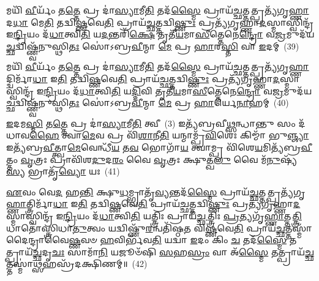 𑌮𑌯𑌿᳴ \ul{𑌵𑍀}\-𑌰𑍍𑌯𑌂᳴ 𑌤\-\ul{𑌤𑍍𑌤𑍇} 𑌪𑍍𑌰 𑌦𑌾॑\-\ul{𑌸𑍍𑌯𑌾}\-𑌮𑍀\-\ul{𑌤𑌿} 𑌤𑌦᳴\-\ul{𑌸𑍍𑌮𑍈} 𑌪𑍍𑌰𑌾𑌯᳴\-\ul{𑌚𑍍𑌛}\-𑌤𑍍𑌤𑌤𑍍𑌪𑍍𑌰𑌤𑍍𑌯᳴𑌗𑍃\-\ul{𑌹𑍍𑌣𑌾}\-𑌦\-\ul{𑌧𑌾} 𑌮𑍇\-\ul{𑌤𑌿} 𑌤𑌦𑍍𑌵𑌿\-\ul{𑌷𑍍𑌣}\-𑌵𑍇\-\ul{𑌤𑌿} 𑌪𑍍𑌰𑌾𑌯᳴\-\ul{𑌚𑍍𑌛}\-𑌤𑍍𑌤𑌦𑍍𑌵𑌿\-\ul{𑌷𑍍𑌣𑍁𑌃} 𑌪𑍍𑌰𑌤𑍍𑌯᳴𑌗𑍃𑌹𑍍𑌣𑌾\-\ul{𑌦}\-𑌸𑍍𑌮𑌾𑌸𑍍𑌵𑌿𑌨𑍍𑌦𑍍𑌰᳴ 𑌇\-\ul{𑌨𑍍𑌦𑍍𑌰𑌿}\-𑌯𑌂 𑌦᳴\-\ul{𑌧𑌾}\-𑌤𑍍𑌵𑌿\-\ul{𑌤𑌿} 𑌯\-\ul{𑌦}\-𑌨𑍍𑌤𑌰𑌿᳴\-\ul{𑌕𑍍𑌷𑍇} 𑌤𑍃𑌤𑍀᳴\-\ul{𑌯}\-𑌮𑌾\-\ul{𑌸𑍀}\-𑌤𑍍𑌤𑍇𑌨𑍇\-\ul{𑌨𑍍𑌦𑍍𑌰𑍋} 𑌵\-\ul{𑌜𑍍𑌰}\-𑌮𑍁𑌦᳴𑌯\-\ul{𑌚𑍍𑌛}\-𑌦𑍍𑌵𑌿𑌷𑍍𑌣𑍍𑌵᳴𑌨𑍁𑌸𑍍𑌥𑌿\-\ul{𑌤𑌃} 𑌸𑍋॑\-𑌽𑌬𑍍𑌰\-\ul{𑌵𑍀}\-𑌨𑍍𑌮𑌾 \ul{𑌮𑍇} 𑌪𑍍𑌰 \ul{𑌹𑌾}\-𑌰\-\ul{𑌸𑍍𑌤𑌿} 𑌵𑌾 \ul{𑌇}\-𑌦𑌮𑍍~(39)

𑌮𑌯𑌿᳴ \ul{𑌵𑍀}\-𑌰𑍍𑌯𑌂᳴ 𑌤\-\ul{𑌤𑍍𑌤𑍇} 𑌪𑍍𑌰 𑌦𑌾॑\-\ul{𑌸𑍍𑌯𑌾}\-𑌮𑍀\-\ul{𑌤𑌿} 𑌤𑌦᳴\-\ul{𑌸𑍍𑌮𑍈} 𑌪𑍍𑌰𑌾𑌯᳴\-\ul{𑌚𑍍𑌛}\-𑌤𑍍𑌤𑌤𑍍𑌪𑍍𑌰𑌤𑍍𑌯᳴𑌗𑍃\-\ul{𑌹𑍍𑌣𑌾}\-𑌦𑍍𑌦𑍍𑌵𑌿𑌰𑍍𑌮𑌾᳴\-\ul{𑌧𑌾} 𑌇\-\ul{𑌤𑌿} 𑌤𑌦𑍍𑌵𑌿\-\ul{𑌷𑍍𑌣}\-𑌵𑍇\-\ul{𑌤𑌿} 𑌪𑍍𑌰𑌾𑌯᳴\-\ul{𑌚𑍍𑌛}\-𑌤𑍍𑌤𑌦𑍍𑌵𑌿\-\ul{𑌷𑍍𑌣𑍁𑌃} 𑌪𑍍𑌰𑌤𑍍𑌯᳴𑌗𑍃𑌹𑍍𑌣𑌾\-\ul{𑌦}\-𑌸𑍍𑌮𑌾𑌸𑍍𑌵𑌿𑌨𑍍𑌦𑍍𑌰᳴ 𑌇\-\ul{𑌨𑍍𑌦𑍍𑌰𑌿}\-𑌯𑌂 𑌦᳴\-\ul{𑌧𑌾}\-𑌤𑍍𑌵𑌿\-\ul{𑌤𑌿} 𑌯\-\ul{𑌦𑍍𑌦𑌿}\-𑌵𑌿 𑌤𑍃𑌤𑍀᳴\-\ul{𑌯}\-𑌮𑌾\-\ul{𑌸𑍀}\-𑌤𑍍𑌤𑍇𑌨𑍇\-\ul{𑌨𑍍𑌦𑍍𑌰𑍋} 𑌵\-\ul{𑌜𑍍𑌰}\-𑌮𑍁𑌦᳴𑌯\-\ul{𑌚𑍍𑌛}\-𑌦𑍍𑌵𑌿𑌷𑍍𑌣𑍍𑌵᳴𑌨𑍁𑌸𑍍𑌥𑌿\-\ul{𑌤𑌃} 𑌸𑍋॑\-𑌽𑌬𑍍𑌰\-\ul{𑌵𑍀}\-𑌨𑍍𑌮𑌾 \ul{𑌮𑍇} 𑌪𑍍𑌰 \ul{𑌹𑌾}\-𑌰𑍍𑌯𑍇\-\ul{𑌨𑌾}\-𑌹𑌮𑍍~(40)

\-\ul{𑌇}\-𑌦𑌮\-\ul{𑌸𑍍𑌮𑌿} 𑌤\-\ul{𑌤𑍍𑌤𑍇} 𑌪𑍍𑌰 𑌦𑌾॑\-\ul{𑌸𑍍𑌯𑌾}\-𑌮𑍀\-\ul{𑌤𑌿} 𑌤𑍍𑌵𑍀~(3) 𑌇𑌤𑍍𑌯᳴𑌬𑍍𑌰𑌵𑍀\-\ul{𑌥𑍍𑌸}\-𑌨𑍍𑌧𑌾𑌨𑍍𑌤𑍁 𑌸𑌂 𑌦᳴𑌧𑌾𑌵\-\ul{𑌹𑍈} 𑌤𑍍𑌵𑌾\-\ul{𑌮𑍇}\-𑌵 𑌪𑍍𑌰 𑌵𑌿᳴\-\ul{𑌶𑌾}\-𑌨𑍀\-\ul{𑌤𑌿} 𑌯𑌨𑍍𑌮𑌾𑌮𑍍𑌪𑍍𑌰᳴\-\ul{𑌵𑌿}\-𑌶𑍇𑌃 𑌕𑌿𑌮𑍍𑌮𑌾᳴ 𑌭𑍁\-\ul{𑌞𑍍𑌜𑍍𑌯𑌾} 𑌇𑌤𑍍𑌯᳴𑌬𑍍𑌰\-\ul{𑌵𑍀}\-𑌤𑍍𑌤𑍍𑌵𑌾\-\ul{𑌮𑍇}\-𑌵𑍇𑌨𑍍𑌧𑍀᳴\-\ul{𑌯} 𑌤\-\ul{𑌵} 𑌭𑍋𑌗𑌾᳴\-\ul{𑌯} 𑌤𑍍𑌵𑌾𑌮𑍍𑌪𑍍𑌰 𑌵𑌿᳴𑌶𑍇\-\ul{𑌯}\-𑌮𑌿𑌤𑍍𑌯᳴𑌬𑍍𑌰\-\ul{𑌵𑍀}\-𑌤𑍍𑌤𑌂 \ul{𑌵𑍃}\-𑌤𑍍𑌰𑌃 𑌪𑍍𑌰𑌾𑌵𑌿᳴𑌶\-\ul{𑌦𑍁}\-𑌦\-\ul{𑌰𑌂} 𑌵𑍈 \ul{𑌵𑍃}\-𑌤𑍍𑌰𑌃 𑌕𑍍𑌷𑍁𑌤𑍍𑌖\-\ul{𑌲𑍁} 𑌵𑍈 𑌮᳴\-\ul{𑌨𑍁}\-𑌷𑍍𑌯᳴\-\ul{𑌸𑍍𑌯} 𑌭𑍍𑌰𑌾𑌤𑍃᳴\-\ul{𑌵𑍍𑌯𑍋} 𑌯𑌃~(41)

\-\ul{𑌏}\-𑌵𑌂 𑌵𑍇\-\ul{𑌦} 𑌹\-\ul{𑌨𑍍𑌤𑌿} 𑌕𑍍𑌷𑍁\-\ul{𑌧}\-𑌮𑍍𑌭𑍍𑌰𑌾𑌤𑍃᳴\-\ul{𑌵𑍍𑌯}\-𑌨𑍍𑌤𑌦᳴\-\ul{𑌸𑍍𑌮𑍈} 𑌪𑍍𑌰𑌾𑌯᳴\-\ul{𑌚𑍍𑌛}\-𑌤𑍍𑌤𑌤𑍍𑌪𑍍𑌰𑌤𑍍𑌯᳴𑌗𑍃\-\ul{𑌹𑍍𑌣𑌾}\-𑌤𑍍𑌤𑍍𑌰𑌿𑌰𑍍𑌮𑌾᳴\-\ul{𑌧𑌾} 𑌇\-\ul{𑌤𑌿} 𑌤𑌦𑍍𑌵𑌿\-\ul{𑌷𑍍𑌣}\-𑌵𑍇\-\ul{𑌤𑌿} 𑌪𑍍𑌰𑌾𑌯᳴\-\ul{𑌚𑍍𑌛}\-𑌤𑍍𑌤𑌦𑍍𑌵𑌿\-\ul{𑌷𑍍𑌣𑍁𑌃} 𑌪𑍍𑌰𑌤𑍍𑌯᳴𑌗𑍃𑌹𑍍𑌣𑌾\-\ul{𑌦}\-𑌸𑍍𑌮𑌾𑌸𑍍𑌵𑌿𑌨𑍍𑌦𑍍𑌰᳴ 𑌇\-\ul{𑌨𑍍𑌦𑍍𑌰𑌿}\-𑌯𑌂 𑌦᳴\-\ul{𑌧𑌾}\-𑌤𑍍𑌵𑌿\-\ul{𑌤𑌿} 𑌯𑌤𑍍𑌤𑍍𑌰𑌿𑌃 𑌪𑍍𑌰𑌾𑌯᳴\-\ul{𑌚𑍍𑌛}\-𑌤𑍍𑌤𑍍𑌰𑌿𑌃 \ul{𑌪𑍍𑌰}\-𑌤𑍍𑌯𑌗𑍃᳴\-\ul{𑌹𑍍𑌣𑌾}\-𑌤𑍍𑌤\-\ul{𑌤𑍍𑌤𑍍𑌰𑌿}\-𑌧𑌾𑌤𑍋॑𑌸𑍍𑌤𑍍𑌰𑌿𑌧𑌾\-\ul{𑌤𑍁}\-𑌤𑍍𑌵𑌂 𑌯𑌦𑍍𑌵𑌿𑌷𑍍𑌣𑍁᳴\-\ul{𑌰}\-𑌨𑍍𑌵𑌤𑌿᳴𑌷𑍍𑌠\-\ul{𑌤} 𑌵𑌿\-\ul{𑌷𑍍𑌣}\-𑌵𑍇\-\ul{𑌤𑌿} 𑌪𑍍𑌰𑌾𑌯᳴\-\ul{𑌚𑍍𑌛}\-𑌤𑍍𑌤𑌸𑍍𑌮𑌾᳴𑌦𑍈𑌨𑍍𑌦𑍍𑌰𑌾𑌵𑍈\-\ul{𑌷𑍍𑌣}\-𑌵𑍞 \ul{𑌹}\-𑌵𑌿𑌰𑍍𑌭᳴𑌵\-\ul{𑌤𑌿} 𑌯𑌦𑍍𑌵𑌾 \ul{𑌇}\-𑌦𑌂 𑌕𑌿𑌂 \ul{𑌚} 𑌤𑌦᳴\-\ul{𑌸𑍍𑌮𑍈} 𑌤𑌤𑍍𑌪𑍍𑌰𑌾𑌯᳴\-\ul{𑌚𑍍𑌛}\-𑌦𑍃\-\ul{𑌚𑌃} 𑌸𑌾𑌮𑌾᳴\-\ul{𑌨𑌿} 𑌯𑌜𑍂𑍞᳴𑌷𑌿 \ul{𑌸}\-𑌹\-\ul{𑌸𑍍𑌰𑌂} 𑌵𑌾 𑌅᳴\-\ul{𑌸𑍍𑌮𑍈} 𑌤𑌤𑍍𑌪𑍍𑌰𑌾𑌯᳴\-\ul{𑌚𑍍𑌛}\-𑌤𑍍𑌤𑌸𑍍𑌮𑌾॑\-\ul{𑌥𑍍𑌸}\-𑌹𑌸𑍍𑌰᳴𑌦𑌕𑍍𑌷𑌿𑌣𑌮𑍍॥~(42)

{\anuvakamend[{\-\ul{𑌪𑍍𑌰}\-\-\ul{𑌵}\-𑌣𑌂 𑌵𑌿\-\ul{𑌷𑍍𑌣𑍁}\-𑌰𑍍𑌵𑌾 \ul{𑌇}\-𑌦\-\ul{𑌮𑌿}\-𑌦\-\ul{𑌮}\-𑌹𑌂 𑌯𑍋 𑌭᳴\-\ul{𑌵}\-𑌤𑍍𑌯𑍇𑌕᳴𑌵𑌿𑍞𑌶𑌤𑌿𑌶𑍍𑌚}]}%

